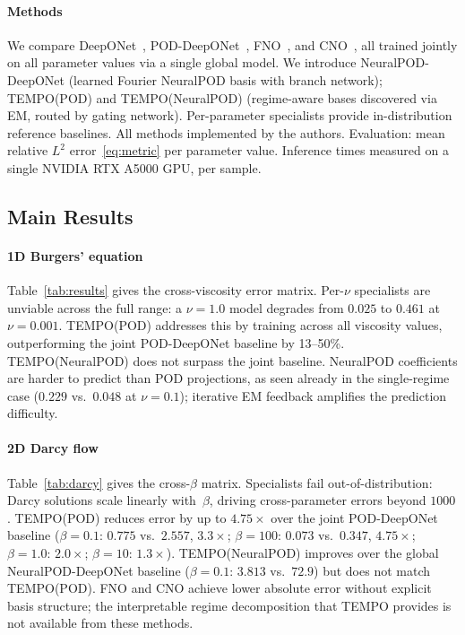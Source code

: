 \documentclass[preprint,10pt]{elsarticle}
\begin{document}
\paragraph{Methods}
We compare DeepONet~\cite{Lu2019}, POD-DeepONet~\cite{Lu2022},
FNO~\cite{Li2021}, and CNO~\cite{Raonic2023}, all trained jointly on all
parameter values via a single global model.
We introduce NeuralPOD-DeepONet (learned Fourier NeuralPOD basis with branch network);
TEMPO(POD) and TEMPO(NeuralPOD) (regime-aware bases discovered via EM, routed by
gating network). Per-parameter specialists provide in-distribution reference baselines.
All methods implemented by the authors.
Evaluation: mean relative $L^2$ error~\eqref{eq:metric} per parameter value.
Inference times measured on a single NVIDIA RTX A5000 GPU, per sample.

\subsection{Main Results}
\label{sec:results}

\paragraph{1D Burgers' equation}
Table~\ref{tab:results} gives the cross-viscosity error matrix.
Per-$\nu$ specialists are unviable across the full range: a $\nu{=}1.0$
model degrades from $0.025$ to $0.461$ at $\nu{=}0.001$.
TEMPO(POD) addresses this by training across all viscosity values,
outperforming the joint POD-DeepONet baseline by 13--50\%.
TEMPO(NeuralPOD) does not surpass the joint baseline. NeuralPOD coefficients
are harder to predict than POD projections, as seen already in the single-regime
case ($0.229$ vs.\ $0.048$ at $\nu{=}0.1$); iterative EM feedback amplifies the prediction difficulty.

\paragraph{2D Darcy flow}
Table~\ref{tab:darcy} gives the cross-$\beta$ matrix.
Specialists fail out-of-distribution: Darcy solutions scale linearly
with~$\beta$, driving cross-parameter errors beyond $1000$.
TEMPO(POD) reduces error by up to $4.75\times$ over the joint POD-DeepONet baseline
($\beta{=}0.1$: $0.775$ vs.\ $2.557$, $3.3\times$; $\beta{=}100$: $0.073$
vs.\ $0.347$, $4.75\times$; $\beta{=}1.0$: $2.0\times$; $\beta{=}10$: $1.3\times$).
TEMPO(NeuralPOD) improves over the global NeuralPOD-DeepONet baseline
($\beta{=}0.1$: $3.813$ vs.\ $72.9$) but does not match TEMPO(POD).
FNO and CNO achieve lower absolute error without explicit basis structure; the interpretable regime decomposition that TEMPO provides is not available from these methods.
\end{document}
